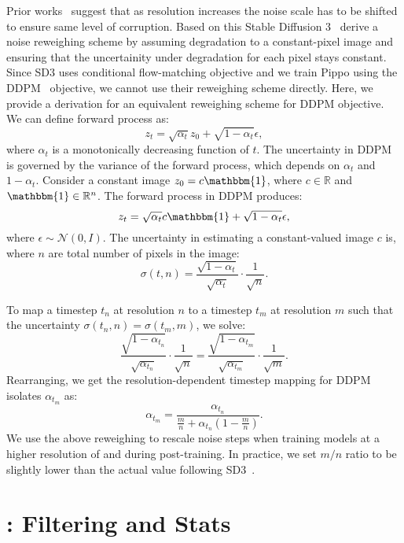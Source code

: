 {
 Prior works~\cite{chen2023importance, esser2024scaling} suggest that as resolution increases the noise scale has to be shifted to ensure same level of corruption. Based on this Stable Diffusion 3~\cite{esser2024scaling} derive a noise reweighing scheme by assuming degradation to a constant-pixel image and ensuring that the uncertainity under degradation for each pixel stays constant. Since SD3 uses conditional flow-matching objective and we train Pippo using the DDPM~\cite{DDPM} objective, we cannot use their reweighing scheme directly. Here, we provide a derivation for an equivalent reweighing scheme for DDPM objective. We can define forward process as:
   \[
   z_t = \sqrt{\alpha_t} z_0 + \sqrt{1 - \alpha_t} \epsilon,
   \]
where \(\alpha_t\) is a monotonically decreasing function of \(t\). The uncertainty in DDPM is governed by the variance of the forward process, which depends on \(\alpha_t\) and \(1 - \alpha_t\). Consider a constant image \(z_0 = c \mathbbm{1}\), where \(c \in \mathbb{R}\) and \(\mathbbm{1} \in \mathbb{R}^n\). The forward process in DDPM produces:
\[
z_t = \sqrt{\alpha_t} c \mathbbm{1} + \sqrt{1 - \alpha_t} \epsilon,
\]
where \(\epsilon \sim \mathcal{N}(0, I)\). The uncertainty in estimating a constant-valued image \(c\) is, where $n$ are total number of pixels in the image:
\[
\sigma(t, n) = \frac{\sqrt{1 - \alpha_t}}{\sqrt{\alpha_t}} \cdot \frac{1}{\sqrt{n}}.
\]

To map a timestep \(t_n\) at resolution \(n\) to a timestep \(t_m\) at resolution \(m\) such that the uncertainty \(\sigma(t_n, n) = \sigma(t_m, m)\), we solve:
\[
\frac{\sqrt{1 - \alpha_{t_n}}}{\sqrt{\alpha_{t_n}}} \cdot \frac{1}{\sqrt{n}} = \frac{\sqrt{1 - \alpha_{t_m}}}{\sqrt{\alpha_{t_m}}} \cdot \frac{1}{\sqrt{m}}.
\]
Rearranging, we get the resolution-dependent timestep mapping for DDPM isolates \(\alpha_{t_m}\) as:
\[
\alpha_{t_m} = \frac{\alpha_{t_n}}{\frac{m}{n} + \alpha_{t_n} \left(1 - \frac{m}{n}\right)}.
\]
We use the above reweighing to rescale noise steps when training models at a higher resolution of \resthree and \resfour during post-training. In practice, we set $m/n$ ratio to be slightly lower than the actual value following SD3~\cite{esser2024scaling}. 






\section{\ig: Filtering and Stats}\label{app_sec:data_filter}

}
